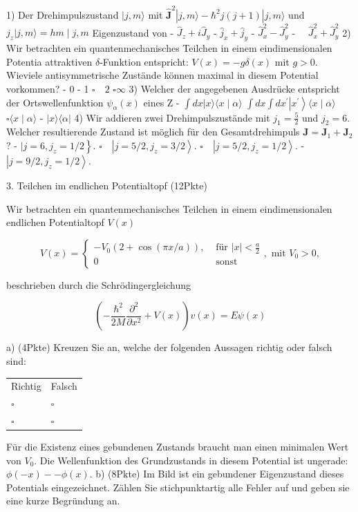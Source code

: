 \documentclass[11pt,a4paper]{article}
\begin{document}
1) Der Drehimpulszustand $|j, m\rangle$ mit $\hat{\mathbf{J}}^2|j, m\rangle-\hbar^2 j(j+1)|j, m\rangle$ und $j_z|j, m\rangle=h m \mid j, m$ Eigenzustand von
- $\hat{J}_z+i \hat{J}_y$
- $\hat{j}_x+\hat{j}_y$
- $\hat{J}_x^2-\hat{J}_y^2$
- $\quad \hat{J}_x^2+\hat{J}_y^2$
2) Wir betrachten ein quantenmechanisches Teilchen in einem eindimensionalen Potentia attraktiven $\delta$-Funktion entspricht: $V(x)=-g \delta(x)$ mit $g>0$. Wieviele antisymmetrische Zustände können maximal in diesem Potential vorkommen?
- 0
- 1
$\square \quad 2$
$\square \infty$
3) Welcher der angegebenen Ausdrücke entspricht der Ortswellenfunktion $\psi_\alpha(x)$ eines Z
- $\int d x|x\rangle\langle x \mid \alpha\rangle$
 $\int d x \int d x^{\prime}\left|x^{\prime}\right\rangle\langle x \mid \alpha\rangle$
$\square\langle x \mid \alpha\rangle$
- $|x\rangle\langle\alpha|$
4) Wir addieren zwei Drehimpulszustände mit $j_1=\frac{5}{2}$ und $j_2=6$. Welcher resultierende Zustand ist möglich für den Gesamtdrehimpuls $\mathbf{J}=\mathbf{J}_1+\mathbf{J}_2$ ?
- $\left.\mid j=6, j_z=1 / 2\right\}$.
$\square \quad\left|j=5 / 2, j_z=3 / 2\right\rangle$.
$\square \quad\left|j=5 / 2, j_z=1 / 2\right\rangle$.
- $\left|j=9 / 2, j_z=1 / 2\right\rangle$.



3. Teilchen im endlichen Potentialtopf (12Pkte)

Wir betrachten ein quantenmechanisches Teilchen in einem eindimensionalen endlichen Potentialtopf $V(x)$

$$
V(x)=\left\{\begin{array}{ll}
-V_0(2+\cos (\pi x / a)), & \text { für }|x|<\frac{a}{2} \\
0 & \text { sonst }
\end{array}, \text { mit } V_0>0,\right.
$$

beschrieben durch die Schrödingergleichung

$$
\left(-\frac{\hbar^2}{2 M} \frac{\partial^2}{\partial x^2}+V(x)\right) v(x)=E \psi(x)
$$

a) (4Pkte) Kreuzen Sie an, welche der folgenden Aussagen richtig oder falsch sind:

\begin{tabular}{ll} 
Richtig & Falsch \\
$\square$ & $\square$ \\
$\square$ & $\square$
\end{tabular}

Für die Existenz eines gebundenen Zustands braucht man einen minimalen Wert von $V_0$. Die Wellenfunktion des Grundzustands in diesem Potential ist ungerade: $\phi(-x)--\phi(x)$.
b) (8Pkte) Im Bild ist ein gebundener Eigenzustand dieses Potentials eingezeichnet. Zählen Sie stichpunktartig alle Fehler auf und geben sie eine kurze Begründung an.
\end{document}
